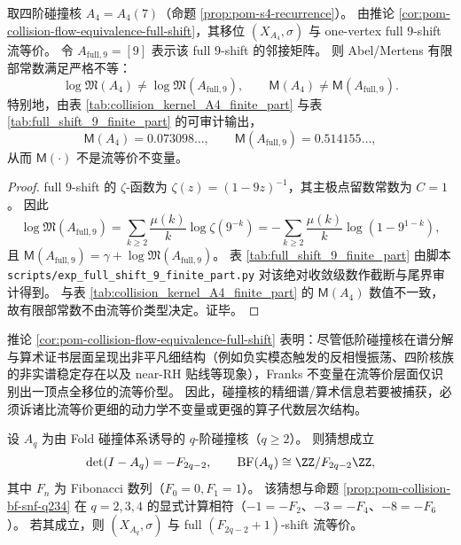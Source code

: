 \begin{proposition}\label{prop:pom-mertens-not-flow-invariant}
取四阶碰撞核 \(A_4=A_4(7)\)（命题 \ref{prop:pom-s4-recurrence}）。
由推论 \ref{cor:pom-collision-flow-equivalence-full-shift}，其移位 \((X_{A_4},\sigma)\) 与 one-vertex full \(9\)-shift 流等价。
令 \(A_{\mathrm{full},9}=[9]\) 表示该 full \(9\)-shift 的邻接矩阵。
则 Abel/Mertens 有限部常数满足严格不等：
\[
\log\mathfrak{M}(A_4)\neq \log\mathfrak{M}(A_{\mathrm{full},9}),
\qquad
\mathsf{M}(A_4)\neq \mathsf{M}(A_{\mathrm{full},9}).
\]
特别地，由表 \ref{tab:collision_kernel_A4_finite_part} 与表 \ref{tab:full_shift_9_finite_part} 的可审计输出，
\[
\mathsf{M}(A_4)=0.073098\ldots,
\qquad
\mathsf{M}(A_{\mathrm{full},9})=0.514155\ldots,
\]
从而 \(\mathsf{M}(\cdot)\) 不是流等价不变量。
\end{proposition}
\begin{proof}
full \(9\)-shift 的 \(\zeta\)-函数为 \(\zeta(z)=(1-9z)^{-1}\)，其主极点留数常数为 \(C=1\)。
因此
\[
\log\mathfrak{M}(A_{\mathrm{full},9})
=\sum_{k\ge 2}\frac{\mu(k)}{k}\log\zeta\!\left(9^{-k}\right)
=-\sum_{k\ge 2}\frac{\mu(k)}{k}\log\!\left(1-9^{1-k}\right),
\]
且 \(\mathsf{M}(A_{\mathrm{full},9})=\gamma+\log\mathfrak{M}(A_{\mathrm{full},9})\)。
表 \ref{tab:full_shift_9_finite_part} 由脚本 \texttt{scripts/exp\_full\_shift\_9\_finite\_part.py} 对该绝对收敛级数作截断与尾界审计得到。
与表 \ref{tab:collision_kernel_A4_finite_part} 的 \(\mathsf{M}(A_4)\) 数值不一致，故有限部常数不由流等价类型决定。证毕。
\end{proof}

\begin{remark}[流等价不变量的塌缩与细谱信息的不可见性]\label{rem:pom-collision-flow-collapse}
推论 \ref{cor:pom-collision-flow-equivalence-full-shift} 表明：尽管低阶碰撞核在谱分解与算术证书层面呈现出非平凡细结构（例如负实模态触发的反相慢振荡、四阶核族的非实谱稳定存在以及 near-RH 贴线等现象），Franks 不变量在流等价层面仅识别出一顶点全移位的流等价型。
因此，碰撞核的精细谱/算术信息若要被捕获，必须诉诸比流等价更细的动力学不变量或更强的算子代数层次结构。
\end{remark}

\begin{conjecture}\label{conj:pom-collision-fibonacci-twist}
设 \(A_q\) 为由 Fold 碰撞体系诱导的 \(q\)-阶碰撞核（\(q\ge 2\)）。
则猜想成立
\[
\det(I-A_q)=-F_{2q-2},
\qquad
\mathrm{BF}(A_q)\cong \ZZ/F_{2q-2}\ZZ,
\]
其中 \(F_n\) 为 Fibonacci 数列（\(F_0=0,F_1=1\)）。
该猜想与命题 \ref{prop:pom-collision-bf-snf-q234} 在 \(q=2,3,4\) 的显式计算相符（\(-1=-F_2\)、\(-3=-F_4\)、\(-8=-F_6\)）。
若其成立，则 \((X_{A_q},\sigma)\) 与 full \((F_{2q-2}+1)\)-shift 流等价。
\end{conjecture}

